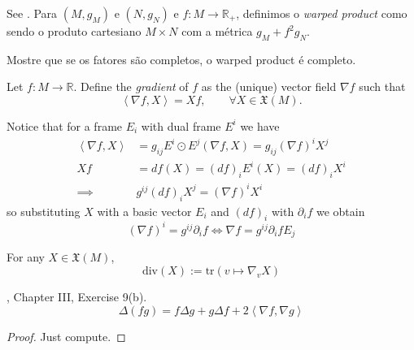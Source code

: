 \medskip\noindent

\begin{exercise}
\label{exercise-wraped-product}
See \cite{pet}. Para $(M,g_M)$ e $(N,g_N)$ e $f:M \to \mathbb{R}_+$, definimos o
 {\it warped product} como sendo o produto cartesiano $M\times N$ com a métrica 
 $g_M+f^2g_N$.

Mostre que se os fatores são completos, o warped product é completo.
\end{exercise}

\begin{definition}
\label{definition-gradient}
Let  $f:M\to\mathbb{R}$. Define the {\it gradient} of $f$ as the (unique) vector
field $\nabla f$ such that
\begin{equation}
\label{equation-gradient}
\left<\nabla f,X\right>=Xf, \qquad \forall X\in\mathfrak{X}(M).
\end{equation}
\end{definition}

Notice that for a frame $E_i$ with dual frame $E^i$ we have
\begin{align*}
\left<\nabla f,X\right>&=g_{ij}E^i\odot E^j(\nabla f,X)
=g_{ij}(\nabla f)^iX^j\\
Xf&=df(X)=(df)_iE^i(X)=(df)_iX^i\\
\implies& g^{ij}(df)_iX^j=(\nabla f)^iX^i
\end{align*}
so substituting $X$ with a basic vector $E_i$ and $(df)_i$ with $\partial_if$ we
obtain
\begin{equation}
\label{equation-gradient-in-coordinates}
(\nabla f)^i=g^{ij}\partial_if \iff \nabla f=g^{ij}\partial_ifE_j
\end{equation}

\begin{definition}
\label{definition-divergence}
For any $X\in \mathfrak{X}(M)$,
$$
\text{div}(X):=\text{tr}(v\mapsto \nabla_vX)
$$
\end{definition}

\begin{lemma}
\label{lemma-Laplacian-of-product}
\cite{doc}, Chapter III, Exercise 9(b).
\begin{equation}
\label{equation-Laplacian-of-product}
\Delta(fg)=f \Delta g + g \Delta f+2\left<\nabla f,\nabla g\right>
\end{equation}
\end{lemma}

\begin{proof}
Just compute.
\end{proof}

